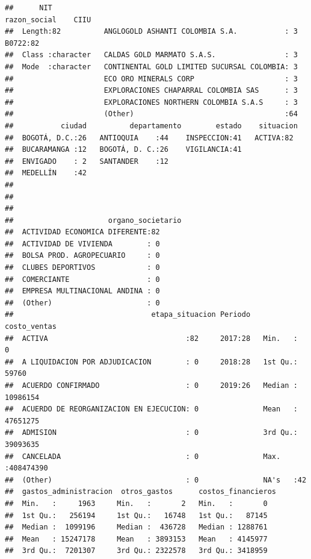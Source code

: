 \documentclass[
  11pt,
]{article}
\begin{document}
\begin{verbatim}
##      NIT                                                razon_social    CIIU   
##  Length:82          ANGLOGOLD ASHANTI COLOMBIA S.A.           : 3    B0722:82  
##  Class :character   CALDAS GOLD MARMATO S.A.S.                : 3              
##  Mode  :character   CONTINENTAL GOLD LIMITED SUCURSAL COLOMBIA: 3              
##                     ECO ORO MINERALS CORP                     : 3              
##                     EXPLORACIONES CHAPARRAL COLOMBIA SAS      : 3              
##                     EXPLORACIONES NORTHERN COLOMBIA S.A.S     : 3              
##                     (Other)                                   :64              
##           ciudad          departamento        estado    situacion 
##  BOGOTÁ, D.C.:26   ANTIOQUIA    :44    INSPECCION:41   ACTIVA:82  
##  BUCARAMANGA :12   BOGOTÁ, D. C.:26    VIGILANCIA:41              
##  ENVIGADO    : 2   SANTANDER    :12                               
##  MEDELLÍN    :42                                                  
##                                                                   
##                                                                   
##                                                                   
##                      organo_societario
##  ACTIVIDAD ECONOMICA DIFERENTE:82     
##  ACTIVIDAD DE VIVIENDA        : 0     
##  BOLSA PROD. AGROPECUARIO     : 0     
##  CLUBES DEPORTIVOS            : 0     
##  COMERCIANTE                  : 0     
##  EMPRESA MULTINACIONAL ANDINA : 0     
##  (Other)                      : 0     
##                                etapa_situacion Periodo    costo_ventas      
##  ACTIVA                                :82     2017:28   Min.   :        0  
##  A LIQUIDACION POR ADJUDICACION        : 0     2018:28   1st Qu.:    59760  
##  ACUERDO CONFIRMADO                    : 0     2019:26   Median : 10986154  
##  ACUERDO DE REORGANIZACION EN EJECUCION: 0               Mean   : 47651275  
##  ADMISION                              : 0               3rd Qu.: 39093635  
##  CANCELADA                             : 0               Max.   :408474390  
##  (Other)                               : 0               NA's   :42         
##  gastos_administracion  otros_gastos      costos_financieros
##  Min.   :     1963     Min.   :       2   Min.   :       0  
##  1st Qu.:   256194     1st Qu.:   16748   1st Qu.:   87145  
##  Median :  1099196     Median :  436728   Median : 1288761  
##  Mean   : 15247178     Mean   : 3893153   Mean   : 4145977  
##  3rd Qu.:  7201307     3rd Qu.: 2322578   3rd Qu.: 3418959  

\end{verbatim}
\end{document}
